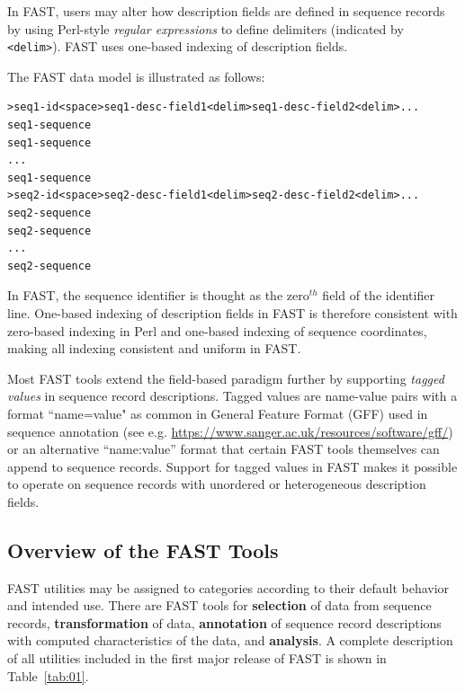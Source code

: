\documentclass{frontiersSCNS} %
\begin{document}
In FAST, users may alter how description fields are defined in
sequence records by using Perl-style {\it regular expressions} to
define delimiters (indicated by {\tt <delim>}). FAST uses one-based
indexing of description fields.

The FAST data model is illustrated as follows:

\begin{verbatim}
>seq1-id<space>seq1-desc-field1<delim>seq1-desc-field2<delim>...
seq1-sequence
seq1-sequence
...
seq1-sequence
>seq2-id<space>seq2-desc-field1<delim>seq2-desc-field2<delim>...
seq2-sequence
seq2-sequence
...
seq2-sequence
\end{verbatim}

In FAST, the sequence identifier is thought as the zero$^{th}$ field
of the identifier line. One-based indexing of description fields in
FAST is therefore consistent with zero-based indexing in Perl and
one-based indexing of sequence coordinates, making all indexing
consistent and uniform in FAST.

Most FAST tools extend the field-based paradigm further by supporting
{\it tagged values} in sequence record descriptions. Tagged values are
name-value pairs with a format ``name=value" as common in General
Feature Format (GFF) used in sequence annotation (see
e.g. \url{https://www.sanger.ac.uk/resources/software/gff/}) or an
alternative ``name:value'' format that certain FAST tools themselves
can append to sequence records. Support for tagged values in FAST makes it
possible to operate on sequence records with unordered or
heterogeneous description fields.

\subsection{Overview of the FAST Tools}

FAST utilities may be assigned to categories according to their
default behavior and intended use. There are FAST tools for {\bf
  selection} of data from sequence records, {\bf transformation} of
data, {\bf annotation} of sequence record descriptions with computed
characteristics of the data, and {\bf analysis}.  A complete
description of all utilities included in the first major release of
FAST is shown in Table~\ref{tab:01}.
\end{document}
